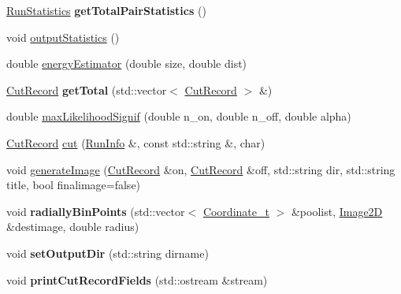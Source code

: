 \begin{DoxyCompactItemize}
\item 
\hypertarget{classCutter_ab5ebc8264e083c5aa66a558f033f78d0}{
\hyperlink{structRunStatistics}{RunStatistics} {\bfseries getTotalPairStatistics} ()}
\label{classCutter_ab5ebc8264e083c5aa66a558f033f78d0}

\item 
\hypertarget{classCutter_a3e456388ddb758748a3b69c8683c0b5a}{
void \hyperlink{classCutter_a3e456388ddb758748a3b69c8683c0b5a}{outputStatistics} ()}
\label{classCutter_a3e456388ddb758748a3b69c8683c0b5a}

\item 
double \hyperlink{classCutter_a2eb708059e0d94349cfa92bdc7551c0b}{energyEstimator} (double size, double dist)
\item 
\hypertarget{classCutter_ad46d67859c5fc57e7efc2936fabca360}{
\hyperlink{structCutRecord}{CutRecord} {\bfseries getTotal} (std::vector$<$ \hyperlink{structCutRecord}{CutRecord} $>$ \&)}
\label{classCutter_ad46d67859c5fc57e7efc2936fabca360}

\item 
double \hyperlink{classCutter_a502eab82b5602adadaa76c7cdb9326d6}{maxLikelihoodSignif} (double n\_\-on, double n\_\-off, double alpha)
\item 
\hyperlink{structCutRecord}{CutRecord} \hyperlink{classCutter_a5c8d71e05e508ec60db78436b4ba416d}{cut} (\hyperlink{classRunInfo}{RunInfo} \&, const std::string \&, char)
\item 
void \hyperlink{classCutter_ac4a14824d14bc9a15e61d6a09a7a4b62}{generateImage} (\hyperlink{structCutRecord}{CutRecord} \&on, \hyperlink{structCutRecord}{CutRecord} \&off, std::string dir, std::string title, bool finalimage=false)
\item 
\hypertarget{classCutter_a6caf41bc19118ac547af26c61282e6db}{
void {\bfseries radiallyBinPoints} (std::vector$<$ \hyperlink{structCoordinate__t}{Coordinate\_\-t} $>$ \&poolist, \hyperlink{classImage2D}{Image2D} \&destimage, double radius)}
\label{classCutter_a6caf41bc19118ac547af26c61282e6db}

\item 
\hypertarget{classCutter_ae6ed9e84dca55866f7ceeea402c5a9b9}{
void {\bfseries setOutputDir} (std::string dirname)}
\label{classCutter_ae6ed9e84dca55866f7ceeea402c5a9b9}

\item 
\hypertarget{classCutter_a4583bb71d7ae87f6d2dd1ca0fc5e1a45}{
void {\bfseries printCutRecordFields} (std::ostream \&stream)}
\label{classCutter_a4583bb71d7ae87f6d2dd1ca0fc5e1a45}


\end{DoxyCompactItemize}
